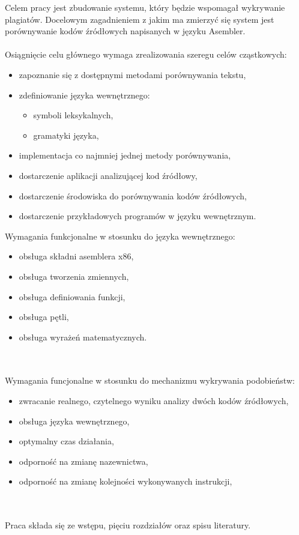 \documentclass[a4paper,12pt]{article}
\begin{document}
Celem pracy jest zbudowanie systemu, który będzie wspomagał wykrywanie plagiatów. Docelowym zagadnieniem z jakim ma zmierzyć się system jest porównywanie kodów źródłowych napisanych w języku Asembler.
\\ \\
Osiągnięcie celu głównego wymaga zrealizowania szeregu celów cząstkowych:
\begin{itemize}
\item zapoznanie się z dostępnymi metodami porównywania tekstu,
\item zdefiniowanie języka wewnętrznego:
\begin{itemize}
	\item symboli leksykalnych,
	\item gramatyki języka,
\end{itemize}
\item implementacja co najmniej jednej metody porównywania,
\item dostarczenie aplikacji analizującej kod źródłowy,
\item dostarczenie środowiska do porównywania kodów źródłowych,
\item dostarczenie przykładowych programów w języku wewnętrznym.
\end{itemize}
\pagebreak
Wymagania funkcjonalne w stosunku do języka wewnętrznego:
\begin{itemize}
\item obsługa składni asemblera x86,
\item obsługa tworzenia zmiennych,
\item obsługa definiowania funkcji,
\item obsługa pętli,
\item obsługa wyrażeń matematycznych.
\end{itemize}
\\ \\
Wymagania funcjonalne w stosunku do mechanizmu wykrywania podobieństw:
\begin{itemize}
\item zwracanie realnego, czytelnego wyniku analizy dwóch kodów źródłowych,
\item obsługa języka wewnętrznego,
\item optymalny czas działania,
\item odporność na zmianę nazewnictwa,
\item odporność na zmianę kolejności wykonywanych instrukcji,
\end{itemize}
\\ \\
Praca składa się ze wstępu, pięciu rozdziałów oraz spisu literatury.
\end{document}
